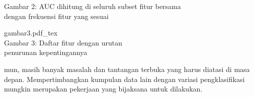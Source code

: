 \documentclass[conference]{IEEEtran}
\begin{document}
\begin{strip}
\begin{multicols}{2}
\begin{flushleft}
            Gambar 2: AUC dihitung di seluruh subset fitur bersama\\
            dengan frekuensi fitur yang sesuai
        \end{flushleft}
        \begin{flushright}
            {gambar3.pdf_tex}\\
            Gambar 3: Daftar fitur dengan urutan\\
            penurunan kepentingannya ~~~~~~~~~~~~~
        \end{flushright}
    \end{multicols}
\end{strip}
\noindent mun, masih banyak masalah dan tantangan terbuka yang harus diatasi di masa depan.
Mempertimbangkan kumpulan data lain dengan variasi pengklasifikasi mungkin merupakan pekerjaan yang bijaksana untuk dilakukan.



\end{document}
